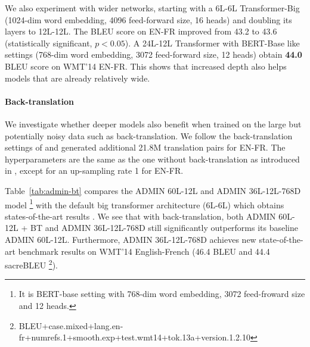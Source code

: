We also experiment with wider networks, starting with a 6L-6L Transformer-Big (1024-dim word embedding, 4096 feed-forward size, 16 heads) and doubling its layers to 12L-12L. The BLEU score on EN-FR improved from 43.2 to 43.6 (statistically significant, $p<0.05$).
A 24L-12L Transformer with BERT-Base like settings (768-dim word embedding, 3072 feed-forward size, 12 heads) obtain \textbf{44.0} BLEU score on WMT'14 EN-FR.
This shows that increased depth also helps models that are already relatively wide.

\paragraph{Back-translation}
We investigate whether deeper models also benefit when trained on the large but potentially noisy data such as back-translation. We follow the back-translation settings of \cite{edunov2018back-nmt} and generated additional 21.8M translation pairs for EN-FR. The hyperparameters are the same as the one without back-translation as introduced in \cite{edunov2018back-nmt}, except for an up-sampling rate 1 for EN-FR.

Table~\ref{tab:admin-bt} compares the ADMIN 60L-12L and ADMIN 36L-12L-768D model \footnote{It is BERT-base setting with 768-dim word embedding, 3072 feed-froward size and 12 heads.} with the default big transformer architecture (6L-6L) which obtains states-of-the-art results \cite{edunov2018back-nmt}. We see that with back-translation, both ADMIN 60L-12L + BT and ADMIN 36L-12L-768D still significantly outperforms its baseline ADMIN 60L-12L. Furthermore, ADMIN 36L-12L-768D achieves new state-of-the-art benchmark results on WMT'14 English-French (46.4 BLEU and 44.4 sacreBLEU \footnote{BLEU+case.mixed+lang.en-fr+numrefs.1+smooth.exp+test.wmt14+tok.13a+version.1.2.10}).

